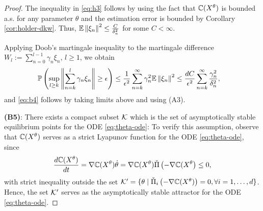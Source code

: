 \begin{proof}
The inequality in \eqref{eq:h3} follows by using the fact that
$\mathbb{C}(X^\theta)$ is bounded a.s. for any parameter $\theta$ and the estimation error  is bounded by Corollary \ref{cor:holder-dkw}.
Thus, $\mathbb{E}\left\| \xi_n\right\|^2 \le \frac{C}{\delta_n^2}$ for some $C<\infty$. 

Applying Doob's martingale inequality to the martingale difference $W_l := \sum_{n=0}^{l-1} \gamma_n \xi_n$, $l\ge 1$, we obtain
\begin{align*}
&\mathbb{P}\left(  \sup_{l\geq k}   \left\|\sum_{n=k}^{l} \gamma_n \xi_n\right\| \geq \epsilon  \right) 
\le \frac{1}{\epsilon^2} \sum_{n=k}^{\infty} \gamma_n^2 \mathbb{E}\left\| \xi_n\right\|^2 \le \dfrac{d C}{\epsilon^2}  \sum_{n=k}^{\infty}  \frac{\gamma_n^2}{\delta_n^2},
\end{align*}
and \eqref{eq:b4} follows by taking limits above and using  (A3).

\noindent\textbf{(B5)}: There exists a compact subset $\mathcal{K}$ which is the set of asymptotically stable equilibrium points for the  ODE \eqref{eq:theta-ode}: To verify this assumption, observe that $\mathbb{C}(X^{\theta})$ serves as a strict Lyapunov function for the ODE \eqref{eq:theta-ode}, since
$$ \dfrac{d \mathbb{C}(X^{\theta})}{dt} = \nabla \mathbb{C}(X^{\theta}) \dot \theta = \nabla \mathbb{C}(X^{\theta}) \check\Pi \left(-\nabla \mathbb{C}(X^{\theta}\right) \le 0,$$
with strict inequality outside the set $\mathcal{K}' = \{\theta \mid \check\Pi_{i} \left(-\nabla \mathbb{C}(X^{\theta})\right)=0, \forall i=1,\ldots,d\}$. Hence, the set $\mathcal{K}'$ serves as the asymptotically stable attractor for the ODE \eqref{eq:theta-ode}.


\end{proof}
